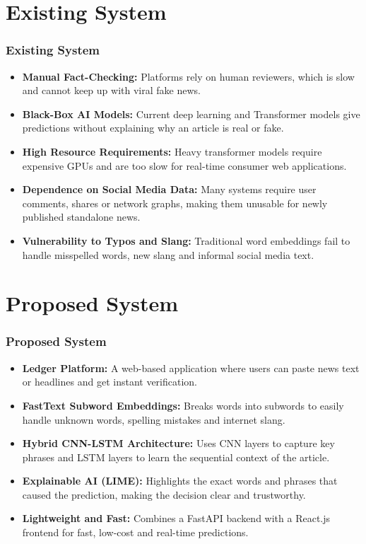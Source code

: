\documentclass{beamer}
\begin{document}
\section{Existing System}
\begin{frame}
\frametitle{Existing System}
\large{
\begin{itemize}
    \item \textbf{Manual Fact-Checking:} Platforms rely on human reviewers, which is slow and cannot keep up with viral fake news.
    \item \textbf{Black-Box AI Models:} Current deep learning and Transformer models give predictions without explaining why an article is real or fake.
    \item \textbf{High Resource Requirements:} Heavy transformer models require expensive GPUs and are too slow for real-time consumer web applications.
    \item \textbf{Dependence on Social Media Data:} Many systems require user comments, shares or network graphs, making them unusable for newly published standalone news.
    \item \textbf{Vulnerability to Typos and Slang:} Traditional word embeddings fail to handle misspelled words, new slang and informal social media text.
\end{itemize}
}
\end{frame}

\section{Proposed System}
\begin{frame}
\frametitle{Proposed System}
\large{
\begin{itemize}
    \item \textbf{Ledger Platform:} A web-based application where users can paste news text or headlines and get instant verification.
    \item \textbf{FastText Subword Embeddings:} Breaks words into subwords to easily handle unknown words, spelling mistakes and internet slang.
    \item \textbf{Hybrid CNN-LSTM Architecture:} Uses CNN layers to capture key phrases and LSTM layers to learn the sequential context of the article.
    \item \textbf{Explainable AI (LIME):} Highlights the exact words and phrases that caused the prediction, making the decision clear and trustworthy.
    \item \textbf{Lightweight and Fast:} Combines a FastAPI backend with a React.js frontend for fast, low-cost and real-time predictions.
\end{itemize}
}
\end{frame}
\end{document}
